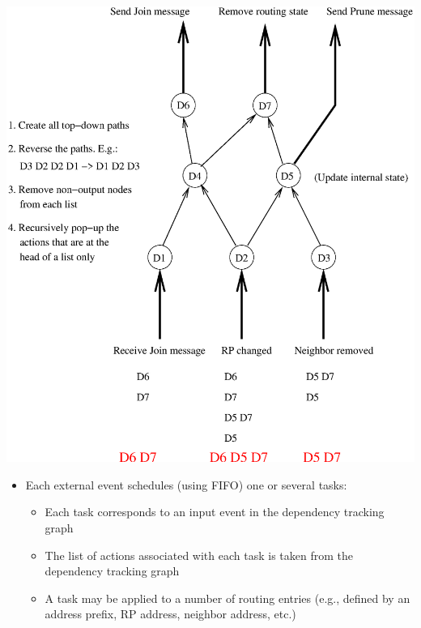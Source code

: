 \documentclass[landscape]{icsislides}
\begin{document}
\begin{slide}

\begin{center}
  \includegraphics[scale=0.55]{figs/pim_state_dependency5}
\end{center}

\end{slide}

\begin{slide}

\begin{itemize}
  \item Each external event schedules (using FIFO) one or several tasks:
  \begin{itemize}
    \item Each task corresponds to an input event in the dependency tracking
    graph
    \item The list of actions associated with each task is taken from the
  dependency tracking graph
    \item A task may be applied to a number of routing entries (e.g., defined
  by an address prefix, RP address, neighbor address, etc.)
  \end{itemize}

\end{itemize}

\end{slide}
\end{document}
